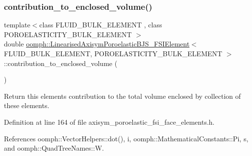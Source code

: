 \subsubsection{\texorpdfstring{contribution\+\_\+to\+\_\+enclosed\+\_\+volume()}{contribution\_to\_enclosed\_volume()}}
{\footnotesize\ttfamily template$<$class F\+L\+U\+I\+D\+\_\+\+B\+U\+L\+K\+\_\+\+E\+L\+E\+M\+E\+NT , class P\+O\+R\+O\+E\+L\+A\+S\+T\+I\+C\+I\+T\+Y\+\_\+\+B\+U\+L\+K\+\_\+\+E\+L\+E\+M\+E\+NT $>$ \\
double \hyperlink{classoomph_1_1LinearisedAxisymPoroelasticBJS__FSIElement}{oomph\+::\+Linearised\+Axisym\+Poroelastic\+B\+J\+S\+\_\+\+F\+S\+I\+Element}$<$ F\+L\+U\+I\+D\+\_\+\+B\+U\+L\+K\+\_\+\+E\+L\+E\+M\+E\+NT, P\+O\+R\+O\+E\+L\+A\+S\+T\+I\+C\+I\+T\+Y\+\_\+\+B\+U\+L\+K\+\_\+\+E\+L\+E\+M\+E\+NT $>$\+::contribution\+\_\+to\+\_\+enclosed\+\_\+volume (\begin{DoxyParamCaption}{ }\end{DoxyParamCaption})\hspace{0.3cm}{\ttfamily [inline]}}



Return this element\textquotesingle{}s contribution to the total volume enclosed by collection of these elements. 



Definition at line 164 of file axisym\+\_\+poroelastic\+\_\+fsi\+\_\+face\+\_\+elements.\+h.



References oomph\+::\+Vector\+Helpers\+::dot(), i, oomph\+::\+Mathematical\+Constants\+::\+Pi, s, and oomph\+::\+Quad\+Tree\+Names\+::W.

\mbox{\label{classoomph_1_1LinearisedAxisymPoroelasticBJS__FSIElement_afab87c435ee121a692dc0f051f2252ab}} 
